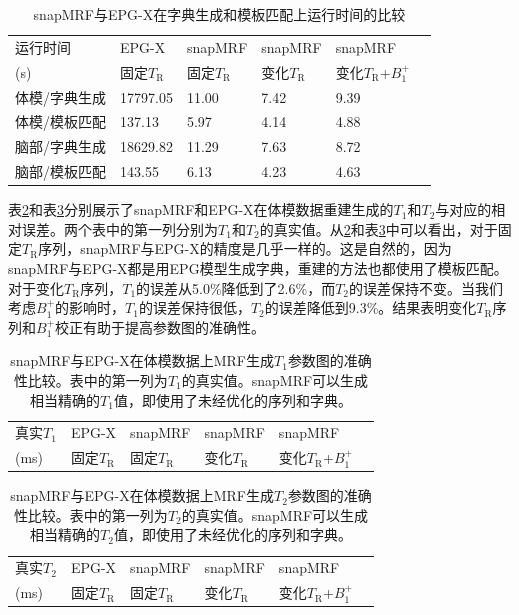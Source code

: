 \begin{table}
\caption{snapMRF与EPG-X在字典生成和模板匹配上运行时间的比较}
\centering
\label{tab:time}
\begin{tabular}{|l|l|l|l|l|l|}
\hline
\hline
运行时间 & EPG-X & snapMRF & snapMRF & snapMRF\\ 
(s) & 固定$T_\mathrm{R}$ & 固定$T_\mathrm{R}$ & 变化$T_\mathrm{R}$ & 变化$T_\mathrm{R}$+$B_1^+$\\
\hline
体模/字典生成 & 17797.05 & 11.00 & 7.42 & 9.39 \\
\hline
体模/模板匹配 & 137.13 & 5.97 & 4.14 & 4.88\\
\hline
脑部/字典生成 & 18629.82 & 11.29 & 7.63 & 8.72 \\
\hline
脑部/模板匹配 & 143.55 & 6.13 & 4.23 & 4.63 \\
\hline
\end{tabular}
\end{table}

表\ref{tab:t1}和表\ref{tab:t2}分别展示了snapMRF和EPG-X在体模数据重建生成的$T_1$和$T_2$与对应的相对误差。两个表中的第一列分别为$T_1$和$T_2$的真实值。从\ref{tab:t1}和表\ref{tab:t2}中可以看出，对于固定$T_\mathrm{R}$序列，snapMRF与EPG-X的精度是几乎一样的。这是自然的，因为snapMRF与EPG-X都是用EPG模型生成字典，重建的方法也都使用了模板匹配。对于变化$T_\mathrm{R}$序列，$T_1$的误差从5.0\%降低到了2.6\%，而$T_2$的误差保持不变。当我们考虑$B_1^+$的影响时，$T_1$的误差保持很低，$T_2$的误差降低到9.3\%。结果表明变化$T_\mathrm{R}$序列和$B_1^+$校正有助于提高参数图的准确性。

\begin{table}
\caption{snapMRF与EPG-X在体模数据上MRF生成$T_1$参数图的准确性比较。表中的第一列为$T_1$的真实值。snapMRF可以生成相当精确的$T_1$值，即使用了未经优化的序列和字典。}
\centering
\label{tab:t1}
\begin{tabular}{|l|l|l|l|l|l|}
\hline
\hline
真实$T_1$ & EPG-X & snapMRF & snapMRF & snapMRF\\ 
(ms) & 固定$T_\mathrm{R}$ & 固定$T_\mathrm{R}$ & 变化$T_\mathrm{R}$ & 变化$T_\mathrm{R}$+$B_1^+$\\
\hline
 
\hline
\end{tabular}
\end{table}

\begin{table}
\caption{snapMRF与EPG-X在体模数据上MRF生成$T_2$参数图的准确性比较。表中的第一列为$T_2$的真实值。snapMRF可以生成相当精确的$T_2$值，即使用了未经优化的序列和字典。}
\centering
\label{tab:t2}
\begin{tabular}{|l|l|l|l|l|l|}
\hline
\hline
真实$T_2$ & EPG-X & snapMRF & snapMRF & snapMRF\\ 
(ms) & 固定$T_\mathrm{R}$ & 固定$T_\mathrm{R}$ & 变化$T_\mathrm{R}$ & 变化$T_\mathrm{R}$+$B_1^+$\\
\hline

\hline
\end{tabular}
\end{table}

